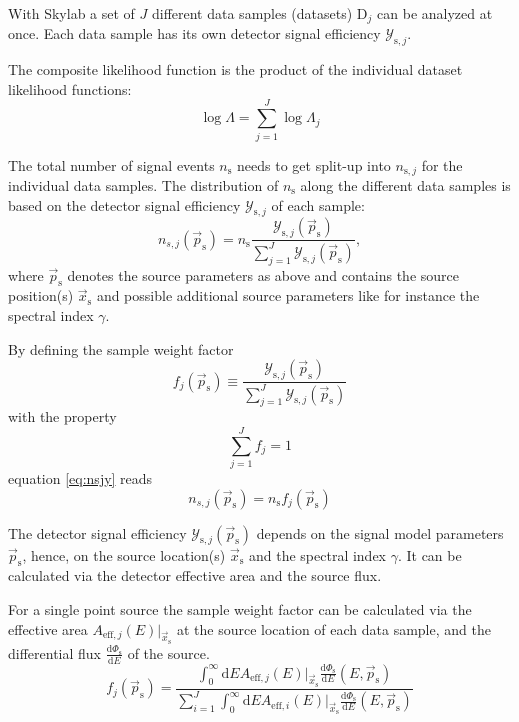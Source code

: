 \documentclass{article}
\newcommand{\ns}{n_{\mathrm{s}}}
\newcommand{\ps}{\vec{p}_{\mathrm{s}}}
\newcommand{\xs}{\vec{x}_{\mathrm{s}}}
\newcommand{\dPhisdE}{\frac{\mathrm{d}\Phi_{\mathrm{s}}}{\mathrm{d}E}}
\begin{document}
With Skylab a set of $J$ different data samples (datasets) $\mathrm{D}_j$ can be
analyzed at once. Each data sample has its own detector signal efficiency
$\mathcal{Y}_{\mathrm{s},j}$.

The composite likelihood function is the product of the individual dataset
likelihood functions:
\begin{equation}
 \log \Lambda = \sum_{j=1}^{J} \log \Lambda_j
 \label{eq:logLambdaComposite}
\end{equation}

The total number of signal events $\ns$ needs to get split-up into
$n_{\mathrm{s},j}$ for the individual data samples. The distribution of $\ns$
along the different data samples is based on the detector signal efficiency
$\mathcal{Y}_{\mathrm{s},j}$ of each sample:
\begin{equation}
 n_{s,j}(\ps) = \ns \frac{\mathcal{Y}_{\mathrm{s},j}(\ps)}{\sum_{j=1}^{J} \mathcal{Y}_{\mathrm{s},j}(\ps)},
 \label{eq:nsjy}
\end{equation}
where $\ps$ denotes the source parameters as above and contains the source
position(s) $\xs$ and possible additional source parameters like
for instance the spectral index $\gamma$.

By defining the sample weight factor
\begin{equation}
 f_j(\ps) \equiv \frac{\mathcal{Y}_{\mathrm{s},j}(\ps)}{\sum_{j=1}^{J} \mathcal{Y}_{\mathrm{s},j}(\ps)}
\end{equation}
with the property
\begin{equation}
 \sum_{j=1}^{J} f_j = 1
\end{equation}
equation \ref{eq:nsjy} reads
\begin{equation}
 n_{s,j}(\ps) = \ns f_{j}(\ps)
 \label{eq:ns-sample-weight-factor}
\end{equation}

The detector signal efficiency $\mathcal{Y}_{\mathrm{s},j}(\ps)$
depends on the signal model parameters $\ps$, hence, on the source location(s) $\xs$
and the spectral index $\gamma$. It can be calculated via the detector effective
area and the source flux.

For a single point source the sample weight factor can be calculated via the effective area
$A_{\mathrm{eff},j}(E)|_{\xs}$ at the source location of each data sample, and the
differential flux $\dPhisdE$ of the source.
\begin{equation}
 f_{j}(\ps) = \frac{\int_0^\infty \mathrm{d}E A_{\mathrm{eff},j}(E)|_{\xs} \dPhisdE(E,\ps)}
	           {\sum_{i=1}^{J} \int_0^\infty \mathrm{d}E A_{\mathrm{eff},i}(E)|_{\xs} \dPhisdE(E,\ps)}
 \label{eq:fj}
\end{equation}
\end{document}
